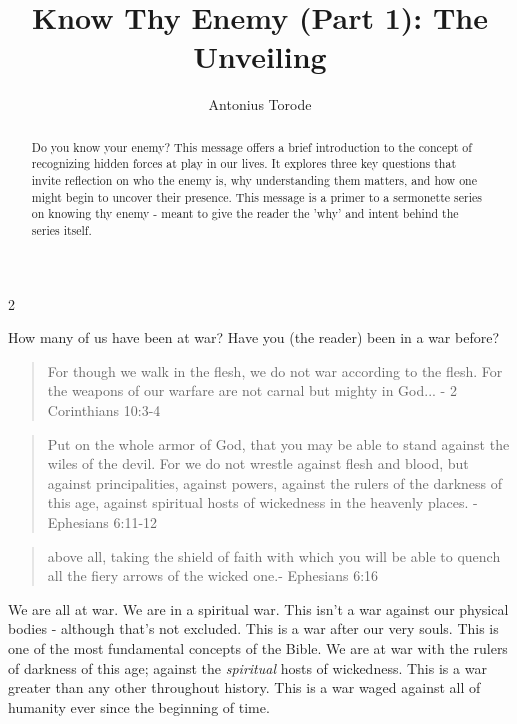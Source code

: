 \documentclass[10pt]{article}
\title{Know Thy Enemy (Part 1): The Unveiling}
\author{Antonius Torode}
\begin{document}
\maketitle
\thispagestyle{fancy}


\begin{abstract}
Do you know your enemy? This message offers a brief introduction to the concept of recognizing hidden forces at play in our lives. It explores three key questions that invite reflection on who the enemy is, why understanding them matters, and how one might begin to uncover their presence. This message is a primer to a sermonette series on knowing thy enemy - meant to give the reader the 'why' and intent behind the series itself.
\end{abstract}

\begin{multicols}{2}

How many of us have been at war? Have you (the reader) been in a war before?

\begin{quotation}
For though we walk in the flesh, we do not war according to the flesh. For the weapons of our warfare are not carnal but mighty in God... - 2 Corinthians 10:3-4
\end{quotation}

\begin{quotation}
Put on the whole armor of God, that you may be able to stand against the wiles of the devil. For we do not wrestle against flesh and blood, but against principalities, against powers, against the rulers of the darkness of this age, against spiritual hosts of wickedness in the heavenly places. - Ephesians 6:11-12
\end{quotation}

\begin{quotation}
above all, taking the shield of faith with which you will be able to quench all the fiery arrows of the wicked one.- Ephesians 6:16
\end{quotation}

We are all at war. We are in a spiritual war. This isn't a war against our physical bodies - although that's not excluded. This is a war after our very souls. This is one of the most fundamental concepts of the Bible. We are at war with the rulers of darkness of this age; against the \textit{spiritual} hosts of wickedness. This is a war greater than any other throughout history. This is a war waged against all of humanity ever since the beginning of time. 


\end{multicols}
\end{document}
